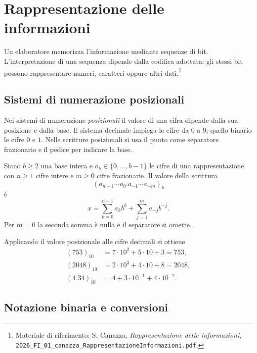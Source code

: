 \chapter{Rappresentazione delle informazioni}
\label{chap:rappresentazione-informazioni}

Un elaboratore memorizza l'informazione mediante sequenze di bit.
L'interpretazione di una sequenza dipende dalla codifica adottata: gli stessi bit possono
rappresentare numeri, caratteri oppure altri dati.\footnote{Materiale di riferimento:
S. Canazza, \emph{Rappresentazione delle informazioni},
\nolinkurl{2026_FI_01_canazza_RappresentazioneInformazioni.pdf}.}

\section{Sistemi di numerazione posizionali}
\label{sec:fi-notazione-posizionale}

Nei sistemi di numerazione \emph{posizionali} il valore di una cifra dipende
dalla sua posizione e dalla base. Il sistema decimale impiega le cifre da
\(0\) a \(9\); quello binario le cifre \(0\) e \(1\). Nelle scritture posizionali si usa il punto come separatore
frazionario e il pedice per indicare la base.

\begin{definition}
\label{def:fi-valore-posizionale}
Siano \(b\ge2\) una base intera e \(a_k\in\{0,\ldots,b-1\}\) le cifre di
una rappresentazione con \(n\ge1\) cifre intere e \(m\ge0\) cifre
frazionarie. Il valore della scrittura
\[
  (a_{n-1}\cdots a_0.a_{-1}\cdots a_{-m})_b
\]
è
\[
  x=\sum_{k=0}^{n-1}a_kb^k+\sum_{j=1}^{m}a_{-j}b^{-j}.
\]
Per \(m=0\) la seconda somma è nulla e il separatore si omette.
\end{definition}

\begin{example}
Applicando il valore posizionale alle cifre decimali si ottiene
\begin{align*}
  (753)_{10}&=7\cdot10^2+5\cdot10+3=753,\\
  (2048)_{10}&=2\cdot10^3+4\cdot10+8=2048,\\
  (4.34)_{10}&=4+3\cdot10^{-1}+4\cdot10^{-2}.
\end{align*}
\end{example}

\section{Notazione binaria e conversioni}
\label{sec:fi-conversioni-binarie}

